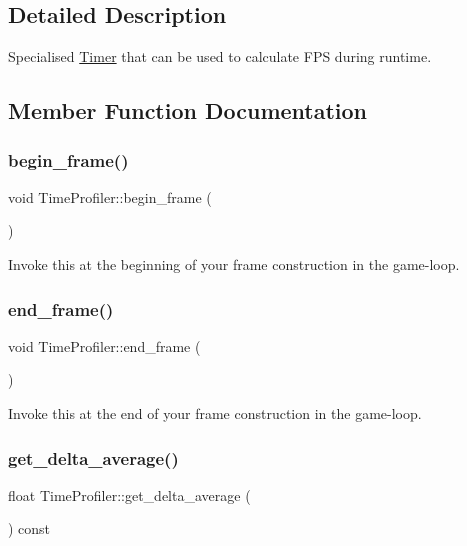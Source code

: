 \subsection{Detailed Description}
Specialised \mbox{\hyperlink{class_timer}{Timer}} that can be used to calculate F\+PS during runtime. 

\subsection{Member Function Documentation}
\mbox{\label{class_time_profiler_a336b6225fb048d7f0cccf4a7fc721bbb}} 
\subsubsection{\texorpdfstring{begin\+\_\+frame()}{begin\_frame()}}
{\footnotesize\ttfamily void Time\+Profiler\+::begin\+\_\+frame (\begin{DoxyParamCaption}{ }\end{DoxyParamCaption})}

Invoke this at the beginning of your frame construction in the game-\/loop. \mbox{\label{class_time_profiler_a51540762400c7493125ba3dbf5dfee4e}} 
\subsubsection{\texorpdfstring{end\+\_\+frame()}{end\_frame()}}
{\footnotesize\ttfamily void Time\+Profiler\+::end\+\_\+frame (\begin{DoxyParamCaption}{ }\end{DoxyParamCaption})}

Invoke this at the end of your frame construction in the game-\/loop. \mbox{\label{class_time_profiler_a6778c6545bc103055ee8e4e4bee57407}} 
\subsubsection{\texorpdfstring{get\+\_\+delta\+\_\+average()}{get\_delta\_average()}}
{\footnotesize\ttfamily float Time\+Profiler\+::get\+\_\+delta\+\_\+average (\begin{DoxyParamCaption}{ }\end{DoxyParamCaption}) const}

